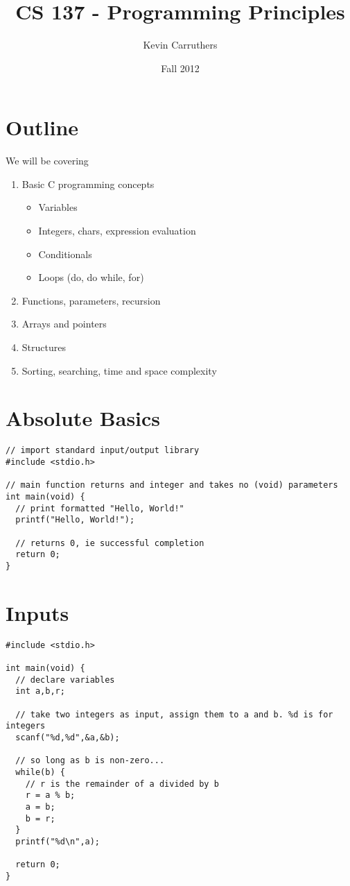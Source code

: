 \documentclass[12pt]{article}
\begin{document}
\title{CS 137 - Programming Principles}
\author{Kevin Carruthers}
\date{\vspace{-2ex}Fall 2012}
\maketitle\HRule

\section*{Outline}
We will be covering
\begin{enumerate}
\item Basic C programming concepts
\begin{itemize}
\item Variables
\item Integers, chars, expression evaluation
\item Conditionals
\item Loops (do, do while, for)
\end{itemize}
\item Functions, parameters, recursion
\item Arrays and pointers
\item Structures
\item Sorting, searching, time and space complexity
\end{enumerate}

\section*{Absolute Basics}
\begin{verbatim}
// import standard input/output library
#include <stdio.h>

// main function returns and integer and takes no (void) parameters
int main(void) {
  // print formatted "Hello, World!"
  printf("Hello, World!");

  // returns 0, ie successful completion
  return 0;
}
\end{verbatim}

\section*{Inputs}
\begin{verbatim}
#include <stdio.h>

int main(void) {
  // declare variables
  int a,b,r;

  // take two integers as input, assign them to a and b. %d is for integers
  scanf("%d,%d",&a,&b);

  // so long as b is non-zero...
  while(b) {
    // r is the remainder of a divided by b
    r = a % b;
    a = b;
    b = r;
  }
  printf("%d\n",a);

  return 0;
}
\end{verbatim}
\end{document}

